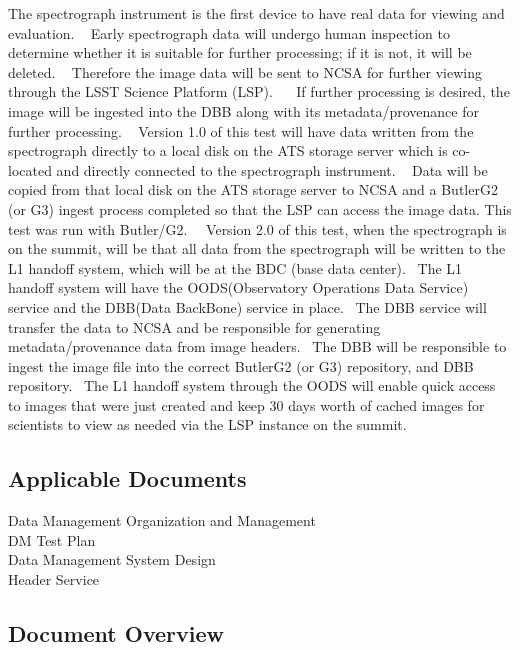 \documentclass[DM,STR,toc]{lsstdoc}
\begin{document}
The spectrograph instrument is the first device to have real data for
viewing and evaluation. ~ Early spectrograph data will undergo human
inspection to determine whether it is suitable for further processing;
if it is not, it will be deleted. ~ Therefore the image data will be
sent to NCSA for further viewing through the LSST Science Platform
(LSP). ~ ~If further processing is desired, the image will be ingested
into the DBB along with its metadata/provenance for further processing.
~ Version 1.0 of this test will have data written from the spectrograph
directly to a local disk on the ATS storage server which is co-located
and directly connected to the spectrograph instrument. ~ Data will be
copied from that local disk on the ATS storage server to NCSA and a
ButlerG2 (or G3) ingest process completed so that the LSP can access the
image data. This test was run with Butler/G2.~ ~Version 2.0 of this
test, when the spectrograph is on the summit, will be that all data from
the spectrograph will be written to the L1 handoff system, which will be
at the BDC (base data center). ~The L1 handoff system will have the
OODS(Observatory Operations Data Service) service and the DBB(Data
BackBone) service in place. ~The DBB service will transfer the data to
NCSA and be responsible for generating metadata/provenance data from
image headers. ~The DBB will be responsible to ingest the image file
into the correct ButlerG2 (or G3) repository, and DBB repository. ~The
L1 handoff system through the OODS will enable quick access to images
that were just created and keep 30 days worth of cached images for
scientists to view as needed via the LSP instance on the summit.
~\\[2\baselineskip]

\subsection{Applicable Documents}\label{applicable-documents}

 Data Management Organization and Management\\
 DM Test Plan\\
 Data Management System Design\\
 Header Service~


\subsection{Document Overview}
\label{sect:docoverview}
\end{document}
